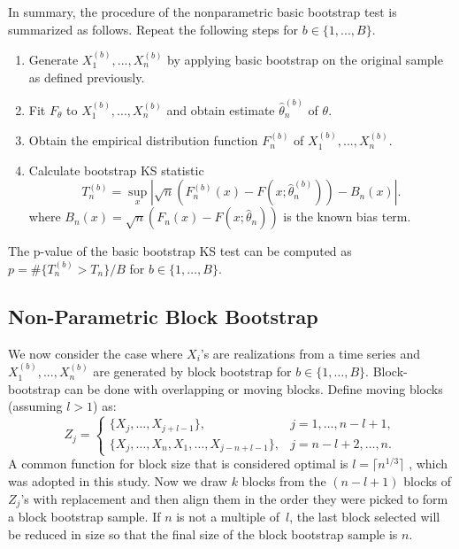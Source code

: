 \documentclass[12pt, titlepage, letterpaper]{article}
\begin{document}
{In summary, the procedure of the nonparametric basic bootstrap test is 
summarized as follows. Repeat the following steps for $b \in \{1, ..., B\}$.
\begin{enumerate}
\item
  Generate $X^{(b)}_1,...,X^{(b)}_n$ by applying basic bootstrap 
  on the original sample as
  defined previously.
\item
  Fit $F_\theta$ to $X^{(b)}_1,...,X^{(b)}_n$ and obtain estimate 
	$\hat\theta^{(b)}_n$ of $\theta$.
\item
  Obtain the empirical distribution function $F^{(b)}_n$ of
  $X^{(b)}_1,...,X^{(b)}_n$. 
\item
  Calculate bootstrap KS statistic
  \[
    T^{(b)}_n = \sup_x | \sqrt{n}\left(F^{(b)}_n(x) 
    - F(x; \hat\theta^{(b)}_n)\right) - B_n(x) |.
  \]
  where 
  $B_{n}(x) = \sqrt{n}(F_n(x) - F(x; \hat\theta_n))$ is the known
  bias term.
\end{enumerate}


The p-value of the basic bootstrap KS test can be computed
as $p = \#\{T^{(b)}_n > T_n\} / B$ for 
$b \in \{1, \ldots, B\}$.

\subsection{Non-Parametric Block Bootstrap}

We now consider the case where $X_i$'s are realizations from a time series and
$X^{(b)}_1,...,X^{(b)}_n$ are generated by block bootstrap for 
$b \in \{1, \ldots, B\}$.  
Block-bootstrap can be done with overlapping or moving blocks.
Define 
moving blocks (assuming $l > 1$) as:
\begin{equation*}
Z_j =
    \begin{cases}
        \{X_j, \ldots, X_{j + l - 1}\}, & j = 1, \dots, n - l + 1,\\
        \{X_j, \ldots, X_n, X_1, \ldots, X_{j-n+l-1}\}, & j = n - l
        + 2 ,\dots, n.
    \end{cases}
\end{equation*}
A common 
function for block size that is considered optimal is 
$l = \lceil n^{1/3} \rceil$ \citep{buhlmann1999block},  
which was adopted in this study.
Now we draw $k$ blocks from the $(n - l + 1)$ blocks 
of $Z_j$'s with replacement and then align them in the order they were picked to
form a block bootstrap sample. If $n$ is not a multiple of~$l$, the last block 
selected will be reduced in size so that the final size of the block bootstrap 
sample is $n$.


}
\end{document}
